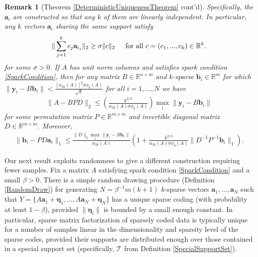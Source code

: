 \documentclass[journal, onecolumn]{IEEEtran}
\newtheorem{remark}{Remark}
\begin{document}
\begin{remark}[Theorem \ref{DeterministicUniquenessTheorem} cont'd]
Specifically, the $\mathbf{a}_i$ are constructed so that any $k$ of them are linearly independent. In particular, any $k$ vectors $\mathbf{a}_i$ sharing the same support satisfy
\begin{align}\label{DataSpread}
\|\sum_{j = 1}^k c_j \mathbf{a}_{i_j}\|_2 \geq \sigma \|c\|_2 \indent \text{for all } c = (c_1, ..., c_k) \in \mathbb{R}^k.
\end{align}
%
for some $\sigma > 0$. If $A$ has unit norm columns and satisfies spark condition \eqref{SparkCondition}, then for any matrix $B \in \mathbb{R}^{n \times m}$ and $k$-sparse $\mathbf{b}_i \in \mathbb{R}^m$ for which $\|\mathbf{y}_i - B\mathbf{b}_i\| < \frac{[\alpha_{2k}(A)]^2\sigma\phi_k(A)}{\sqrt{k}}$ for all $i = 1, \ldots, N$ we have
\begin{align}
\|A - BPD\|_2 \leq \left(  \frac{k^{2/3}}{\alpha_{2k}(A)\sigma\phi_k(A)} \right) \max_i \|\mathbf{y}_i - B\mathbf{b}_i\|
\end{align}
%
for some permutation matrix $P \in \mathbb{R}^{m \times m}$ and invertible diagonal matrix $D \in \mathbb{R}^{m \times m}$. Moreover, 
\begin{align}\label{b_PDa}
\|\mathbf{b}_i - PD\mathbf{a}_i\|_1 \leq \frac{ \|D\|_2 \max_i \|\mathbf{y}_i - B\mathbf{b}_i\|}{\alpha_{2k}(A)}  \left( 1 + \frac{k^{2/3}}{\alpha_{2k}(A)\sigma\phi_k(A)}\|D^{-1}P^{-1}\mathbf{b}_i\|_1 \right).
\end{align}
\end{remark}

Our next result exploits randomness to give a different construction requiring fewer samples. Fix a matrix $A$ satisfying spark condition \eqref{SparkCondition} and a small $\beta > 0$. There is a simple random drawing procedure (Definition \ref{RandomDraw}) for generating $N = \beta^{-1}m(k+1)$ $k$-sparse vectors $\mathbf{a}_1, \ldots, \mathbf{a}_N$ such that $Y = \{A\mathbf{a}_1 + \mathbf{\eta}_1, \ldots, A\mathbf{a}_N + \mathbf{\eta}_N\}$ has a unique sparse coding (with probability at least $1 - \beta$), provided $\|\mathbf{\eta}_i\|$ is bounded by a small enough constant. In particular, sparse matrix factorization of sparsely coded data is typically unique for a number of samples linear in the dimensionality and sparsity level of the sparse codes, provided their supports are distributed enough over those contained in a special support set (specifically, $\mathcal{T}$ from Definition \ref{SpecialSupportSet}).
\end{document}
